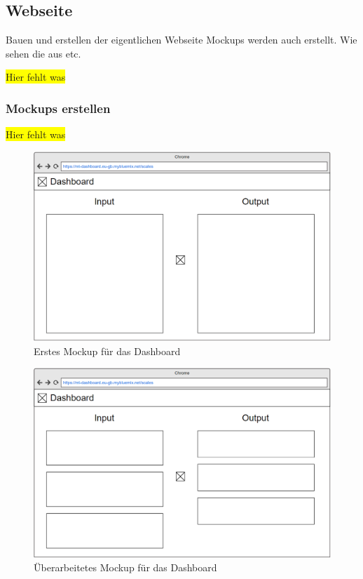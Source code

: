 \subsection{Webseite}
\label{subsec:webseite}
Bauen und erstellen der eigentlichen Webseite
Mockups werden auch erstellt. Wie sehen die aus etc.

\colorbox{yellow}{Hier fehlt was}

\subsubsection{Mockups erstellen}
\colorbox{yellow}{Hier fehlt was}

\begin{figure}[h]
    \centering
    \includegraphics[width=\textwidth]{images/kapitel_4/mockup_scale_1.png}
    \caption{Erstes Mockup für das Dashboard}
    \label{fig:umsetzung_mockup_scale_1}
\end{figure}

\begin{figure}[h]
    \centering
    \includegraphics[width=\textwidth]{images/kapitel_4/mockup_scale_2.png}
    \caption{Überarbeitetes Mockup für das Dashboard}
    \label{fig:umsetzung_mockup_scale_2}
\end{figure}

